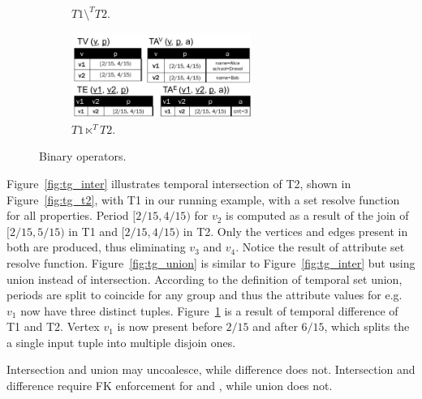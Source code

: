 \begin{figure}
\begin{subfigure}{2.3in}
\caption{$T1 \setminus^T T2$.}
\vspace{-0.2cm}
\label{fig:tg_diff}
\end{subfigure}
\begin{subfigure}{2.3in}
\includegraphics[width=2.3in]{figs/T1_semij_T2_rel.pdf}
\caption{$T1 \ltimes^T T2$.}
\vspace{-0.2cm}
\label{fig:tg_semij}
\end{subfigure}
\caption{Binary operators.}
\label{fig:binary}
\vspace{-0.2cm}
\end{figure}

Figure~\ref{fig:tg_inter} illustrates temporal intersection of \tg T2,
shown in Figure~\ref{fig:tg_t2}, with T1 in our running example, with
a set resolve function for all properties.  Period $[2/15, 4/15)$ for
  $v_2$ is computed as a result of the join of $[2/15, 5/15)$ in T1
    and [$2/15, 4/15)$ in T2.  Only the vertices and edges present in
      both \tgs are produced, thus eliminating $v_3$ and $v_4$.
      Notice the result of attribute set resolve function.
      Figure~\ref{fig:tg_union} is similar to
      Figure~\ref{fig:tg_inter} but using union instead of
      intersection.  According to the definition of temporal set
      union, periods are split to coincide for any group and thus the
      attribute values for e.g. $v_1$ now have three distinct tuples.
      Figure~\ref{fig:tg_diff} is a result of temporal difference of
      T1 and T2.  Vertex $v_1$ is now present before $2/15$ and after
      $6/15$, which splits the a single input tuple into multiple
      disjoin ones.

Intersection and union may uncoalesce, while difference does not.
Intersection and difference require FK enforcement for \tav and \tae,
while union does not.



